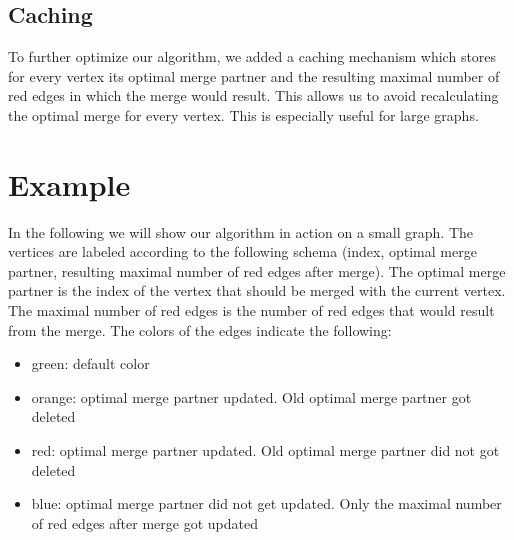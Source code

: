 \documentclass[10pt]{article}
\begin{document}
\subsection{Caching}
To further optimize our algorithm, we added a caching mechanism which stores for every
vertex its optimal merge partner and the resulting maximal number of red edges in which
the merge would result. This allows us to avoid recalculating the optimal merge for every
vertex. This is especially useful for large graphs.

\section{Example}
In the following we will show our algorithm in action on a small graph. The vertices are
labeled according to the following schema (index, optimal merge partner, resulting
maximal number of red edges after merge). The optimal merge partner is the index of the
vertex that should be merged with the current vertex. The maximal number of red edges is
the number of red edges that would result from the merge. The colors of the edges
indicate the following:
\begin{itemize}
    \item green: default color
    \item orange: optimal merge partner updated. Old optimal merge partner got deleted
    \item red: optimal merge partner updated. Old optimal merge partner did not got deleted
    \item blue: optimal merge partner did not get updated. Only the maximal number of red edges
          after merge got updated
\end{itemize}

\end{document}
